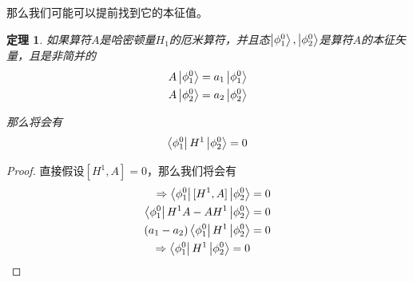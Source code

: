 \documentclass{article}
\newtheorem{theorem}{定理}
\begin{document}
那么我们可能可以提前找到它的本征值。

\begin{theorem}
    如果算符$A$是哈密顿量$H_1$的厄米算符，并且态$\ket{\phi_1^0},\ket{\phi_2^0}$是算符$A$的本征矢量，且是非简并的
    \begin{align*}
        A\ket{\phi_1^0}=a_1\ket{\phi_1^0}\\
        A\ket{\phi_2^0}=a_2\ket{\phi_2^0}
    \end{align*}

    那么将会有
    \begin{align*}
        \bra{\phi_1^0}H^1\ket{\phi_2^0}=0
    \end{align*}
\end{theorem}

\begin{proof}
    直接假设$[H^1,A]=0$，那么我们将会有
    \begin{align*}
        \Rightarrow \bra{\phi_1^0}[H^1,A]\ket{\phi_2^0}&=0\\
        \bra{\phi_1^0}H^1A-AH^1\ket{\phi_2^0}&=0\\
        (a_1-a_2)\bra{\phi_1^0}H^1\ket{\phi_2^0}&=0\\
        \Rightarrow \bra{\phi_1^0}H^1\ket{\phi_2^0}=0
    \end{align*}
\end{proof}
\end{document}
